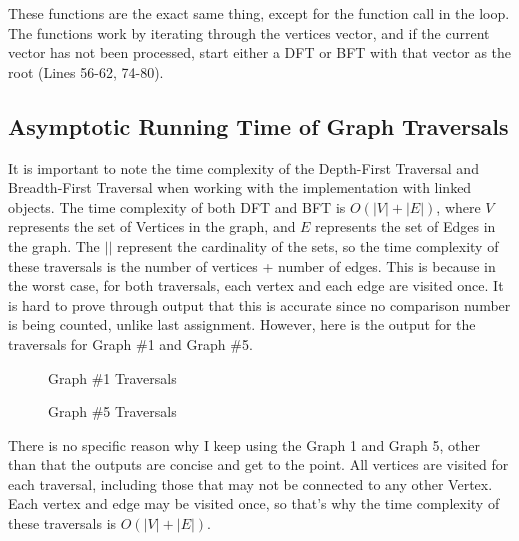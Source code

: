 \documentclass[letterpaper, 10pt]{article}
\begin{document}
\noindent
These functions are the exact same thing, except for the function call in the loop. The functions work by iterating through the vertices vector, and if the current vector has not been processed, start either a DFT or BFT with that vector as the root (Lines 56-62, 74-80). 

\vspace{2em}
\subsection{Asymptotic Running Time of Graph Traversals}

\noindent
It is important to note the time complexity of the Depth-First Traversal and Breadth-First Traversal when working with the implementation with linked objects. The time complexity of both DFT and BFT is $O(|V| + |E|)$, where $V$ represents the set of Vertices in the graph, and $E$ represents the set of Edges in the graph. The $||$ represent the cardinality of the sets, so the time complexity of these traversals is the number of vertices + number of edges. This is because in the worst case, for both traversals, each vertex and each edge are visited once. It is hard to prove through output that this is accurate since no comparison number is being counted, unlike last assignment. However, here is the output for the traversals for Graph \#1 and Graph \#5.

\begin{figure}[H] 
    \centering 
    \caption{Graph \#1 Traversals}
    \label{fig:figure2.22}
\end{figure}

\begin{figure}[H] 
    \centering 
    \caption{Graph \#5 Traversals}
    \label{fig:figure2.23}
\end{figure}

\noindent
There is no specific reason why I keep using the Graph 1 and Graph 5, other than that the outputs are concise and get to the point. All vertices are visited for each traversal, including those that may not be connected to any other Vertex. Each vertex and edge may be visited once, so that's why the time complexity of these traversals is $O(|V| + |E|)$.
\end{document}

